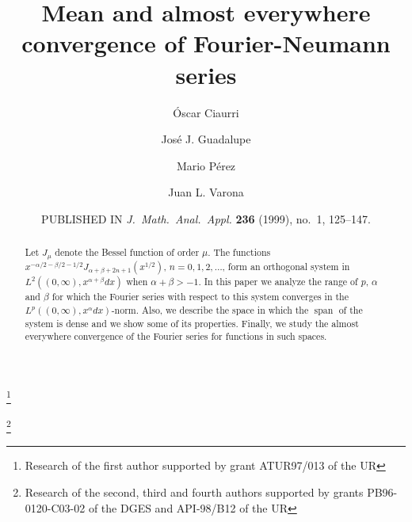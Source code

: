 \documentclass[reqno]{amsart}
\date{PUBLISHED IN \textit{J.\ Math.\ Anal.\ Appl.}
\textbf{236} (1999), no.~1, 125--147.}
\theoremstyle{plain}
\theoremstyle{definition}
\theoremstyle{remark}
\newcommand{\spa}{\operatorname{span}} %
\begin{document}
\title[Fourier-Neumann series]{Mean and almost everywhere
convergence of Fourier-Neumann series}

\author[\'O. Ciaurri]{\'Oscar Ciaurri}
\address{Departamento de Matem\'aticas y Computaci\'on,
Universidad de La Rioja, Edificio J.~L.~Vives,
Calle Luis de Ulloa s/n, 26004 Logro\~no, Spain}
\thanks{Research of the first author supported by grant ATUR97/013 of the UR}

\author[J. J. Guadalupe]{Jos\'e J. Guadalupe}
\address{Departamento de Matem\'aticas y Computaci\'on,
Universidad de La Rioja, Edificio J.~L.~Vives,
Calle Luis de Ulloa s/n, 26004 Logro\~no, Spain}

\author[M. P\'erez]{Mario P\'erez}
\address{Departamento de Matem\'aticas,
Universidad de Zaragoza, Edificio de Matem\'aticas,
Ciudad Universitaria s/n, 50009 Zaragoza, Spain}

\author[J. L. Varona]{Juan L. Varona}
\address{Departamento de Matem\'aticas y Computaci\'on,
Universidad de La Rioja, Edificio J.~L.~Vives,
Calle Luis de Ulloa s/n, 26004 Logro\~no, Spain}
\thanks{Research of the second, third and fourth authors supported by grants
PB96-0120-C03-02 of the DGES and API-98/B12 of the UR}



\begin{abstract}
Let $J_\mu$ denote the Bessel function of order $\mu$. The functions
$x^{-\alpha/2-\beta/2-1/2}J_{\alpha+\beta+2n+1}(x^{1/2})$, $n = 0, 1, 2, \dots$,
form an orthogonal system in $L^2((0,\infty),x^{\alpha+\beta}dx)$
when $\alpha+\beta>-1$.
In this paper we analyze the range of $p$, $\alpha$ and $\beta$ for which the
Fourier series with respect to this system converges in the
$L^p((0,\infty),x^\alpha dx)$-norm. Also, we describe the space in which the
$\spa$ of the system is dense and we show some of its properties.
Finally, we study the almost everywhere convergence of the Fourier series
for functions in such spaces.
\end{abstract}

\maketitle
\end{document}
